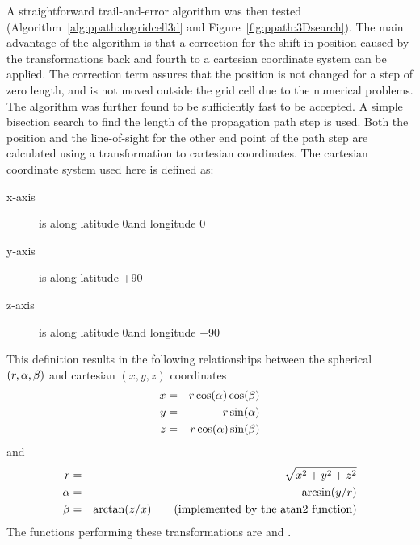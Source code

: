 A straightforward trail-and-error algorithm was then tested
(Algorithm~\ref{alg:ppath:dogridcell3d} and
Figure~\ref{fig:ppath:3Dsearch}). The main advantage of the algorithm
is that a correction for the shift in position caused by the
transformations back and fourth to a cartesian coordinate system can
be applied. The correction term assures that the position is not
changed for a step of zero length, and is not moved outside the grid
cell due to the numerical problems. The algorithm was further found to
be sufficiently fast to be accepted. A simple bisection search to find
the length of the propagation path step is used. Both the position and
the line-of-sight for the other end point of the path step are
calculated using a transformation to cartesian coordinates.  The
cartesian coordinate system used here is defined as:
\begin{description}
\item[x-axis] is along latitude 0\degree and longitude 0\degree
\item[y-axis] is along latitude +90\degree
\item[z-axis] is along latitude 0\degree and longitude +90\degree
\end{description}
This definition results in the following relationships between the
spherical $(r,\alpha,\beta)$ and cartesian $(x,y,z)$ coordinates
\begin{eqnarray}
  x &=& r \cos(\alpha) \cos(\beta) \nonumber \\
  y &=& r \sin(\alpha)            \\
  z &=& r \cos(\alpha) \sin(\beta) \nonumber
 \label{eq:ppath:sph2cart}
\end{eqnarray}
and
\begin{eqnarray}
  \Rds &=& \sqrt{x^2+y^2+z^2}  \nonumber  \\
  \Lat &=& \arcsin(y/\Rds)                \\
  \Lon &=& \arctan(z/x) \qquad \mathrm{(implemented\ by\ the\ atan2\ function)}
                               \nonumber
 \label{eq:ppath:cart2sph}
\end{eqnarray}
The functions performing these transformations are  and
.


